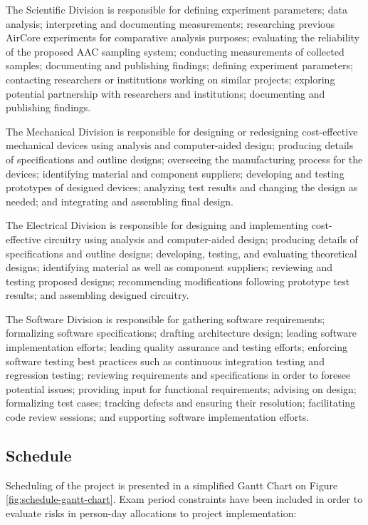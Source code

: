 \documentclass[a4paper,12pt,twoside]{article}
\begin{document}
The Scientific Division is responsible for defining experiment parameters; data analysis; interpreting and documenting measurements; researching previous AirCore experiments for comparative analysis purposes; evaluating the reliability of the proposed AAC sampling system; conducting measurements of collected samples; documenting and publishing findings; defining experiment parameters; contacting researchers or institutions working on similar projects; exploring potential partnership with researchers and institutions; documenting and publishing findings.

The Mechanical Division is responsible for designing or redesigning cost-effective mechanical devices using analysis and computer-aided design; producing details of specifications and outline designs; overseeing the manufacturing process for the devices; identifying material and component suppliers; developing and testing prototypes of designed devices; analyzing test results and changing the design as needed; and integrating and assembling final design.

The Electrical Division is responsible for designing and implementing cost-effective circuitry using analysis and computer-aided design; producing details of specifications and outline designs; developing, testing, and evaluating theoretical designs; identifying material as well as component suppliers; reviewing and testing proposed designs; recommending modifications following prototype test results; and assembling designed circuitry.

The Software Division is responsible for gathering software requirements; formalizing software specifications; drafting architecture design; leading software implementation efforts; leading quality assurance and testing efforts; enforcing software testing best practices such as continuous integration testing and regression testing; reviewing requirements and specifications in order to foresee potential issues; providing input for functional requirements; advising on design; formalizing test cases; tracking defects and ensuring their resolution; facilitating code review sessions; and supporting software implementation efforts.
\pagebreak
\subsection{Schedule}

Scheduling of the project is presented in a simplified Gantt Chart on Figure \ref{fig:schedule-gantt-chart}. Exam period constraints have been included in order to evaluate risks in person-day allocations to project implementation:
\end{document}
